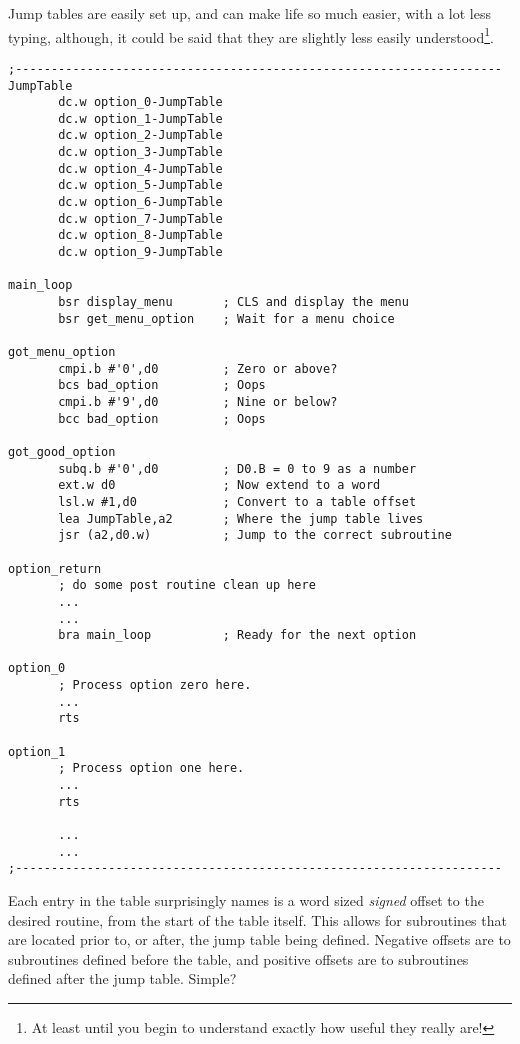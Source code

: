 Jump tables are easily set up, and can make life so much easier, with a lot less typing, although, it could be said that they are slightly less easily understood\footnote{At least until you begin to understand exactly how useful they really are!}.

\begin{lstlisting}[firstnumber=1,caption={Processing User Options - Jump Tables}]
;--------------------------------------------------------------------  
JumpTable
       dc.w option_0-JumpTable
       dc.w option_1-JumpTable
       dc.w option_2-JumpTable
       dc.w option_3-JumpTable
       dc.w option_4-JumpTable
       dc.w option_5-JumpTable
       dc.w option_6-JumpTable
       dc.w option_7-JumpTable
       dc.w option_8-JumpTable
       dc.w option_9-JumpTable
       
main_loop
       bsr display_menu       ; CLS and display the menu
       bsr get_menu_option    ; Wait for a menu choice
       
got_menu_option
       cmpi.b #'0',d0         ; Zero or above?
       bcs bad_option         ; Oops
       cmpi.b #'9',d0         ; Nine or below?
       bcc bad_option         ; Oops
       
got_good_option
       subq.b #'0',d0         ; D0.B = 0 to 9 as a number
       ext.w d0               ; Now extend to a word
       lsl.w #1,d0            ; Convert to a table offset
       lea JumpTable,a2       ; Where the jump table lives
       jsr (a2,d0.w)          ; Jump to the correct subroutine

option_return           
       ; do some post routine clean up here      
       ...
       ...
       bra main_loop          ; Ready for the next option
       
option_0
       ; Process option zero here.
       ...
       rts
       
option_1
       ; Process option one here.
       ...
       rts

       ...
       ...
;--------------------------------------------------------------------
\end{lstlisting}

Each entry in the table surprisingly names  is a word sized \emph{signed} offset to the desired routine, from the start of the table itself. This allows for subroutines that are located prior to, or after, the jump table being defined. Negative offsets are to subroutines defined before the table, and positive offsets are to subroutines defined after the jump table. Simple? 

